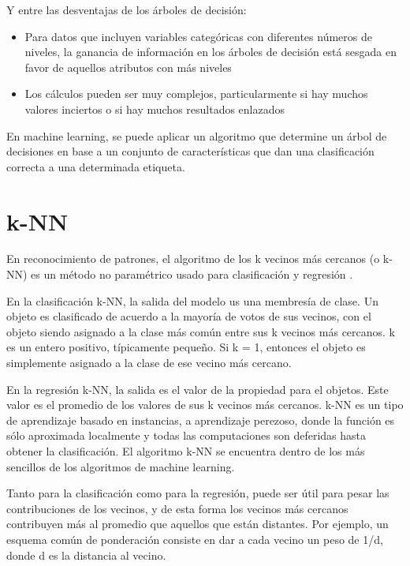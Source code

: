 Y entre las desventajas de los árboles de decisión:

\begin{itemize}
  \item Para datos que incluyen variables categóricas con diferentes
    números de niveles, la ganancia de información en los árboles de
    decisión está sesgada en favor de aquellos atributos con más
    niveles \cite{deng2011bias}
    \item Los cálculos pueden ser muy complejos, particularmente si
      hay muchos valores inciertos o si hay muchos resultados enlazados
\end{itemize}

En machine learning, se puede aplicar un algoritmo que determine un
árbol de decisiones en base a un conjunto de características que dan
una clasificación correcta a una determinada etiqueta.



\section{k-NN}
\label{knn}

En reconocimiento de patrones, el algoritmo de los k vecinos más
cercanos (o k-NN) es un método no paramétrico usado para
clasificación y regresión \cite{altman1992introduction}.

En la clasificación k-NN, la salida del modelo us una membresía de
clase. Un objeto es clasificado de acuerdo a la mayoría de votos de
sus vecinos, con el objeto siendo asignado a la clase más común entre
sus k vecinos más cercanos. k es un entero positivo, típicamente
pequeño. Si k = 1, entonces el objeto es simplemente asignado a la
clase de ese vecino más cercano.

En la regresión k-NN, la salida es el valor de la propiedad para el
objetos. Este valor es el promedio de los valores de sus k vecinos más
cercanos. k-NN es un tipo de aprendizaje basado en instancias, a
aprendizaje perezoso, donde la función es sólo aproximada localmente y
todas las computaciones son deferidas hasta obtener la
clasificación. El algoritmo k-NN se encuentra dentro de los más
sencillos de los algoritmos de machine learning.

Tanto para la clasificación como para la regresión, puede ser útil
para pesar las contribuciones de los vecinos, y de esta forma los
vecinos más cercanos contribuyen más al promedio que aquellos que
están distantes. Por ejemplo, un esquema común de ponderación consiste
en dar a cada vecino un peso de 1/d, donde d es la distancia al vecino.

